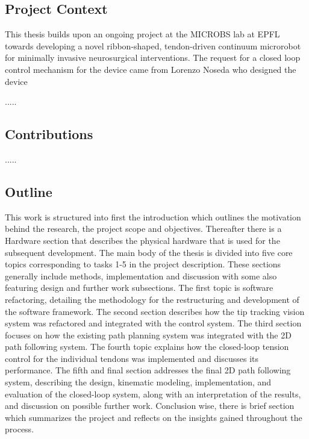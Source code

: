 \subsection{Project Context}

This thesis builds upon an ongoing project at the MICROBS lab at EPFL towards developing a novel ribbon-shaped, tendon-driven continuum microrobot for minimally invasive neurosurgical interventions. The request for a closed loop control mechanism for the device came from Lorenzo Noseda who designed the device 

.....




\subsection{Contributions}

.....


\subsection{Outline}
This work is structured into first the introduction which outlines the motivation behind the research, the project scope and objectives. Thereafter there is a Hardware section that describes the physical hardware that is used for the subsequent development.
\newline \newline 
The main body of the thesis is divided into five core topics corresponding to tasks 1-5 in the project description. These sections generally include methods, implementation and discussion with some also featuring design and further work subsections.
\newline \newline 
The first topic is software refactoring, detailing the methodology for the restructuring and development of the software framework. The second section describes how the tip tracking vision system was refactored and integrated with the control system. The third section focuses on how the existing path planning system was integrated with the 2D path following system. The fourth topic explains how the closed-loop tension control for the individual tendons was implemented and discusses its performance. The fifth and final section addresses the final 2D path following system, describing the design, kinematic modeling, implementation, and evaluation of the closed-loop system, along with an interpretation of the results, and discussion on possible further work.
\newline \newline
Conclusion wise, there is brief section which summarizes the project and reflects on the insights gained throughout the process.


